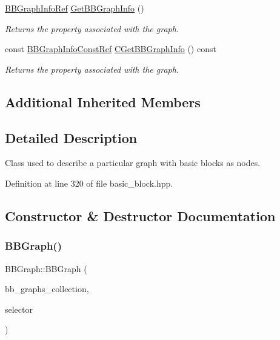 \begin{DoxyCompactItemize}
\hyperlink{basic__block_8hpp_a7fedb7a9906aec21ae08b9f603e42b6d}{B\+B\+Graph\+Info\+Ref} \hyperlink{structBBGraph_ad0b39f19870684dc311670bfcfa0549b}{Get\+B\+B\+Graph\+Info} ()
\begin{DoxyCompactList}\small\item\em Returns the property associated with the graph. \end{DoxyCompactList}\item 
const \hyperlink{basic__block_8hpp_a36fb0dc395f0395a8a09dca03b034e78}{B\+B\+Graph\+Info\+Const\+Ref} \hyperlink{structBBGraph_a3cd121592236889c951a9d35d39471e4}{C\+Get\+B\+B\+Graph\+Info} () const
\begin{DoxyCompactList}\small\item\em Returns the property associated with the graph. \end{DoxyCompactList}\end{DoxyCompactItemize}
\subsection*{Additional Inherited Members}


\subsection{Detailed Description}
Class used to describe a particular graph with basic blocks as nodes. 

Definition at line 320 of file basic\+\_\+block.\+hpp.



\subsection{Constructor \& Destructor Documentation}
\mbox{\label{structBBGraph_ad61c411b14472f81d07dfc90b312a2b1}} 
\subsubsection{\texorpdfstring{B\+B\+Graph()}{BBGraph()}\hspace{0.1cm}{\footnotesize\ttfamily [1/2]}}
{\footnotesize\ttfamily B\+B\+Graph\+::\+B\+B\+Graph (\begin{DoxyParamCaption}\item[{const \hyperlink{basic__block_8hpp_ab2c15dfa325570d7a3e0e364c2f5fdfa}{B\+B\+Graphs\+Collection\+Ref}}]{bb\+\_\+graphs\+\_\+collection,  }\item[{int}]{selector }\end{DoxyParamCaption})}



